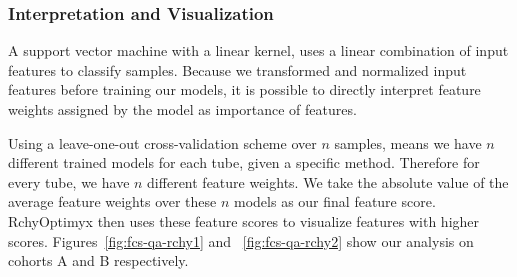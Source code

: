 \subsubsection{Interpretation and Visualization}
A support vector machine with a linear kernel, uses a linear combination of input features to classify samples. Because we transformed and normalized input features before training our models, it is possible to directly interpret feature weights assigned by the model as importance of features.

Using a leave-one-out cross-validation scheme over $n$ samples, means we have $n$ different trained models for each tube, given a specific method. Therefore for every tube, we have $n$ different feature weights. We take the absolute value of the average feature weights over these $n$ models as our final feature score. RchyOptimyx then uses these feature scores to visualize features with higher scores. Figures~\ref{fig:fcs-qa-rchy1} and ~\ref{fig:fcs-qa-rchy2} show our analysis on cohorts A and B respectively.

